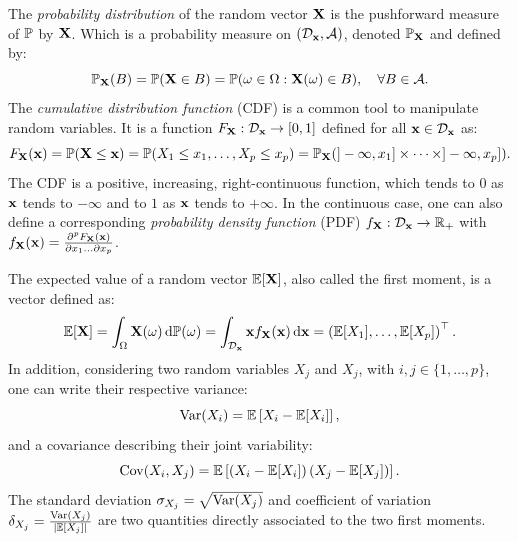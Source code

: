The \textit{probability distribution} of the random vector $\bX$ is the pushforward measure of $\P$ by $\bX$.
Which is a probability measure on $(\iD_{\bx}, \iA)$, denoted $\P_{\bX}$ and defined by: 
\begin{equation}
    \P_{\bX}(B) = \P(\bX \in B) = \P(\omega \in \Omega : \bX(\omega)\in B), \quad \forall B \in \iA.
\end{equation}
The \textit{cumulative distribution function} (CDF) is a common tool to manipulate random variables. 
It is a function $F_{\bX} : \iD_{\bx} \rightarrow [0, 1]$ defined for all $\bx \in \iD_{\bx}$ as: 
\begin{equation}
    F_{\bX}(\bx) = \P(\bX \leq \bx)
            = \P(X_1 \leq x_1, \dots, X_p \leq x_p)
            = \P_{\bX}(]-\infty, x_1] \times \dots \times ]-\infty, x_p]).
\end{equation}
The CDF is a positive, increasing, right-continuous function, which tends to $0$ as $\bx$ tends to $-\infty$ and to $1$ as $\bx$ tends to $+\infty$.
In the continuous case, one can also define a corresponding \textit{probability density function} (PDF) $f_{\bX}: \iD_{\bx} \rightarrow \R_+$  with 
$f_{\bX}(\bx) = \frac{\partial^p F_{\bX}(\bx)}{\partial x_1 \dots \partial x_p}$.

The expected value of a random vector $\E[\bX]$, also called the first moment, is a vector defined as:
\begin{equation}
    \E[\bX] = \int_{\Omega} \bX(\omega) \,\d \P(\omega) =  \int_{\iD_{\bx}} \bx f_{\bX}(\bx) \, \d\bx = \left(\E[X_1], \dots, \E[X_p]\right)\TT.
\end{equation}
In addition, considering two random variables $X_j$ and $X_j$, with $i, j \in \{1, \dots, p\}$, one can write their respective variance:
\begin{equation}
    \var(X_i) = \E\left[X_i - \E[X_i]\right],
\end{equation}
and a covariance describing their joint variability:
\begin{equation}
    \cov(X_i, X_j) = \E\left[\left(X_i - \E[X_i]\right) \left(X_j - \E[X_j]\right)\right].
\end{equation}
The standard deviation $\sigma_{X_j} = \sqrt{\var(X_j)}$ and coefficient of variation $\delta_{X_j} = \frac{\var(X_j)}{|\E[X_j]|}$ are two quantities directly associated to the two first moments.



